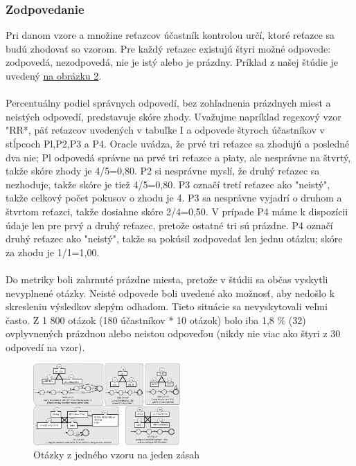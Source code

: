 \documentclass[10pt,twoside,slovak,a4paper]{article}
\begin{document}
\subsubsection{Zodpovedanie}
Pri danom vzore a množine reťazcov účastník kontrolou určí, ktoré reťazce sa budú zhodovať so vzorom. Pre každý reťazec existujú štyri možné odpovede: zodpovedá, nezodpovedá, nie je istý alebo je prázdny. Príklad z našej štúdie je uvedený \hyperref[fig:obrazok2]{na obrázku 2}.\cite{Chapman2017}\\\\
Percentuálny podiel správnych odpovedí, bez zohľadnenia prázdnych miest a neistých odpovedí, predstavuje skóre zhody. Uvažujme napríklad regexový vzor "RR*, päť reťazcov uvedených v tabuľke I a odpovede štyroch účastníkov v stĺpcoch Pl,P2,P3 a P4. Oracle uvádza, že prvé tri reťazce sa zhodujú a posledné dva nie; Pl odpovedá správne na prvé tri reťazce a piaty, ale nesprávne na štvrtý, takže skóre zhody je 4/5=0,80. P2 si nesprávne myslí, že druhý reťazec sa nezhoduje, takže skóre je tiež 4/5=0,80. P3 označí tretí reťazec ako "neistý", takže celkový počet pokusov o zhodu je 4. P3 sa nesprávne vyjadrí o druhom a štvrtom reťazci, takže dosiahne skóre 2/4=0,50. V prípade P4 máme k dispozícii údaje len pre prvý a druhý reťazec, pretože ostatné tri sú prázdne. P4 označí druhý reťazec ako "neistý", takže sa pokúsil zodpovedať len jednu otázku; skóre za zhodu je 1/1=1,00.\cite{Chapman2017}\\\\
Do metriky boli zahrnuté prázdne miesta, pretože v štúdii sa občas vyskytli nevyplnené otázky. Neisté odpovede boli uvedené ako možnosť, aby nedošlo k skresleniu výsledkov slepým odhadom. Tieto situácie sa nevyskytovali veľmi často. Z 1 800 otázok (180 účastníkov * 10 otázok) bolo iba 1,8 \% (32) ovplyvnených prázdnou alebo neistou odpoveďou (nikdy nie viac ako štyri z 30 odpovedí na vzor). \cite{Chapman2017}
\begin{figure}[h]
	\centering
	\includegraphics[width=0.5\textwidth]{obrazok1.png}
	\caption{Otázky z jedného vzoru na jeden zásah \cite{Chapman2017}}
	\label{fig:obrazok2}
  \end{figure}
\end{document}
